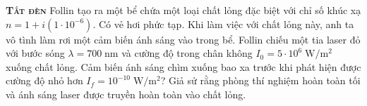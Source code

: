 \begin{problem}{\textbf{\textsc{Tắt đèn}}} Follin tạo ra một bể chứa một loại chất lỏng đặc biệt với chỉ số khúc xạ $n = 1 + i(1\cdot 10^{-6}).$ Có vẻ hơi phức tạp. Khi làm việc với chất lỏng này, anh ta vô tình làm rơi một cảm biến ánh sáng vào trong bể. Follin chiếu một tia laser đỏ với bước sóng $\lambda=700\;\text{nm}$ và cường độ trong chân không $I_0 = 5\cdot 10^{6}\;\mathrm{W/m^2}$ xuống chất lỏng. Cảm biến ánh sáng chìm xuống bao xa trước khi phát hiện được cường độ nhỏ hơn $I_f = 10^{-10}\;\mathrm{W/m^2}$? Giả sử rằng phòng thí nghiệm hoàn toàn tối và ánh sáng laser được truyền hoàn toàn vào chất lỏng.  

\end{problem}
